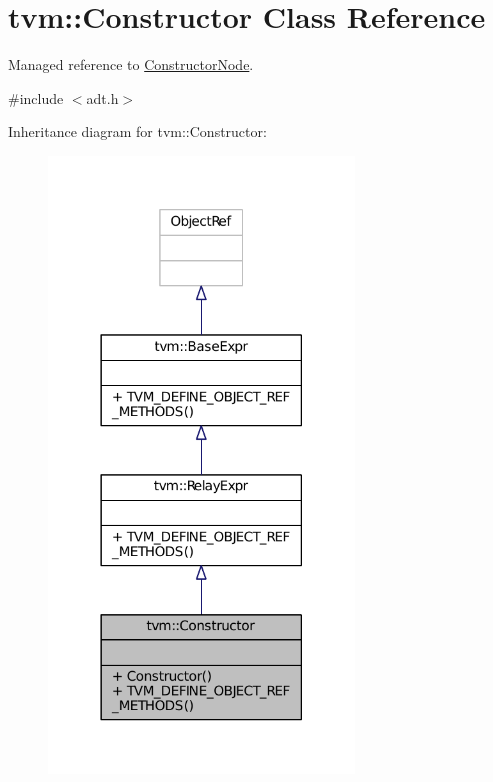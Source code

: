 \hypertarget{classtvm_1_1Constructor}{}\section{tvm\+:\+:Constructor Class Reference}
\label{classtvm_1_1Constructor}


Managed reference to \hyperlink{classtvm_1_1ConstructorNode}{Constructor\+Node}.  




{\ttfamily \#include $<$adt.\+h$>$}



Inheritance diagram for tvm\+:\+:Constructor\+:
\nopagebreak
\begin{figure}[H]
\begin{center}
\leavevmode
\includegraphics[width=230pt]{classtvm_1_1Constructor__inherit__graph}
\end{center}
\end{figure}


